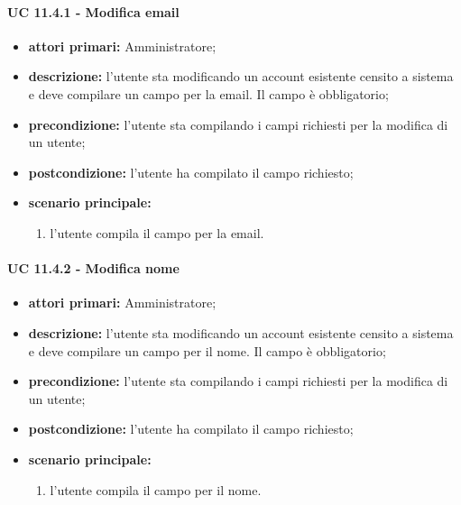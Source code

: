 				\paragraph{UC 11.4.1 - Modifica email}
				\begin{itemize}
					\item \textbf{attori primari:} Amministratore;
					\item \textbf{descrizione:} l'utente sta modificando un account esistente censito a sistema e deve compilare un campo per la email. Il campo è obbligatorio;
					\item \textbf{precondizione:} l'utente sta compilando i campi richiesti per la modifica di un utente;
					\item \textbf{postcondizione:} l'utente ha compilato il campo richiesto;
					\item \textbf{scenario principale:}
					\begin{enumerate}
						\item{l'utente compila il campo per la email.}
					\end{enumerate}	
				\end{itemize}

				\paragraph{UC 11.4.2 - Modifica nome}
				\begin{itemize}
					\item \textbf{attori primari:} Amministratore;
					\item \textbf{descrizione:} l'utente sta modificando un account esistente censito a sistema e deve compilare un campo per il nome. Il campo è obbligatorio;
					\item \textbf{precondizione:} l'utente sta compilando i campi richiesti per la modifica di un utente;
					\item \textbf{postcondizione:} l'utente ha compilato il campo richiesto;
					\item \textbf{scenario principale:}
					\begin{enumerate}
						\item{l'utente compila il campo per il nome.}
					\end{enumerate}	
				\end{itemize}

